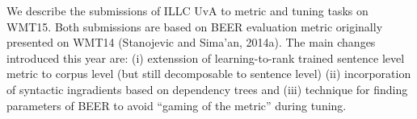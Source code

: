 We describe the submissions of ILLC UvA to metric and tuning tasks on WMT15. Both submissions are based on BEER evaluation metric originally presented on WMT14 (Stanojevic and Sima'an, 2014a). The main changes introduced this year are: (i) extenssion of learning-to-rank trained sentence level metric to corpus level (but still decomposable to sentence level) (ii) incorporation of syntactic ingradients based on dependency trees and (iii) technique for finding parameters of BEER to avoid ``gaming of the metric'' during tuning.
